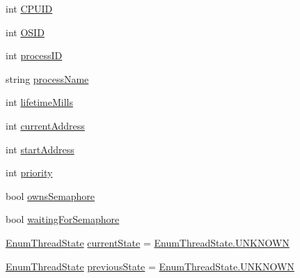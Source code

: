 \begin{DoxyCompactItemize}
\item 
int \hyperlink{class_c_p_u___o_s___simulator_1_1_operating___system_1_1_threading_1_1_thread_control_block_adec46684a6dc77022198da6e1af24f13}{C\+P\+U\+I\+D}
\item 
int \hyperlink{class_c_p_u___o_s___simulator_1_1_operating___system_1_1_threading_1_1_thread_control_block_aaed988e0c316f89bb561e9e9385f39bf}{O\+S\+I\+D}
\item 
int \hyperlink{class_c_p_u___o_s___simulator_1_1_operating___system_1_1_threading_1_1_thread_control_block_aa05f8ca72d6e1c223846ca54e8af5f8f}{process\+I\+D}
\item 
string \hyperlink{class_c_p_u___o_s___simulator_1_1_operating___system_1_1_threading_1_1_thread_control_block_a168a5180396d815cade5ef09f03ceae1}{process\+Name}
\item 
int \hyperlink{class_c_p_u___o_s___simulator_1_1_operating___system_1_1_threading_1_1_thread_control_block_a661391a66ad6faa73c4702656ec079e4}{lifetime\+Mills}
\item 
int \hyperlink{class_c_p_u___o_s___simulator_1_1_operating___system_1_1_threading_1_1_thread_control_block_a5bfadb9128f4e23f5f84175faa44ca93}{current\+Address}
\item 
int \hyperlink{class_c_p_u___o_s___simulator_1_1_operating___system_1_1_threading_1_1_thread_control_block_a022f8a117c755ff19268f38b29654207}{start\+Address}
\item 
int \hyperlink{class_c_p_u___o_s___simulator_1_1_operating___system_1_1_threading_1_1_thread_control_block_af578f17610e77a46038e4f2e4cf7b849}{priority}
\item 
bool \hyperlink{class_c_p_u___o_s___simulator_1_1_operating___system_1_1_threading_1_1_thread_control_block_a3af7da813b6c6d89fcd686cb03c28ab4}{owns\+Semaphore}
\item 
bool \hyperlink{class_c_p_u___o_s___simulator_1_1_operating___system_1_1_threading_1_1_thread_control_block_ad779f070727d0c5c33f5e65cc9b1a8dc}{waiting\+For\+Semaphore}
\item 
\hyperlink{namespace_c_p_u___o_s___simulator_1_1_operating___system_1_1_threading_af7d2481e1618940da9be7dcc5aff9472}{Enum\+Thread\+State} \hyperlink{class_c_p_u___o_s___simulator_1_1_operating___system_1_1_threading_1_1_thread_control_block_adee332110280c675b2d2ad4851347e0c}{current\+State} = \hyperlink{namespace_c_p_u___o_s___simulator_1_1_operating___system_1_1_threading_af7d2481e1618940da9be7dcc5aff9472a696b031073e74bf2cb98e5ef201d4aa3}{Enum\+Thread\+State.\+U\+N\+K\+N\+O\+W\+N}
\item 
\hyperlink{namespace_c_p_u___o_s___simulator_1_1_operating___system_1_1_threading_af7d2481e1618940da9be7dcc5aff9472}{Enum\+Thread\+State} \hyperlink{class_c_p_u___o_s___simulator_1_1_operating___system_1_1_threading_1_1_thread_control_block_aa0970c42cbdf32c8a7c2559c31da8932}{previous\+State} = \hyperlink{namespace_c_p_u___o_s___simulator_1_1_operating___system_1_1_threading_af7d2481e1618940da9be7dcc5aff9472a696b031073e74bf2cb98e5ef201d4aa3}{Enum\+Thread\+State.\+U\+N\+K\+N\+O\+W\+N}
\end{DoxyCompactItemize}


